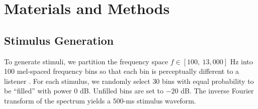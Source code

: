 \documentclass[journal]{IEEEtran}
\begin{document}

% 
% 
% 
% 


\section{Materials and Methods }

\subsection{Stimulus Generation}

To generate stimuli, we partition the frequency space $f \in [100,~13,000]$ Hz
into 100 mel-spaced frequency bins
so that each bin is perceptually different to a listener \cite{polfremanSoundSpottingFrameBased2001}.
For each stimulus, we randomly select $30$ bins
with equal probability to be ``filled'' with power $0$ dB.
Unfilled bins are set to $-20$ dB.
The inverse Fourier transform of the spectrum yields a $500$-ms stimulus waveform.
\end{document}

